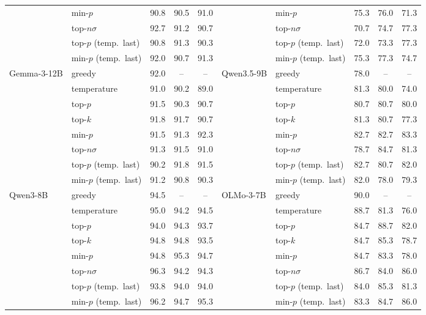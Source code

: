\begin{tabular}{llccc@{\hspace{14pt}}llccc}
 & min-$p$ & 90.8 & 90.5 & 91.0 &  & min-$p$ & 75.3 & 76.0 & 71.3 \\
 & top-$n\sigma$ & 92.7 & 91.2 & 90.7 &  & top-$n\sigma$ & 70.7 & 74.7 & 77.3 \\
 & top-$p$ (temp.\ last) & 90.8 & 91.3 & 90.3 &  & top-$p$ (temp.\ last) & 72.0 & 73.3 & 77.3 \\
 & min-$p$ (temp.\ last) & 92.0 & 90.7 & 91.3 &  & min-$p$ (temp.\ last) & 75.3 & 77.3 & 74.7 \\
\midrule
Gemma-3-12B & greedy & 92.0 & -- & -- & Qwen3.5-9B & greedy & 78.0 & -- & -- \\
 & temperature & 91.0 & 90.2 & 89.0 &  & temperature & 81.3 & 80.0 & 74.0 \\
 & top-$p$ & 91.5 & 90.3 & 90.7 &  & top-$p$ & 80.7 & 80.7 & 80.0 \\
 & top-$k$ & 91.8 & 91.7 & 90.7 &  & top-$k$ & 81.3 & 80.7 & 77.3 \\
 & min-$p$ & 91.5 & 91.3 & 92.3 &  & min-$p$ & 82.7 & 82.7 & 83.3 \\
 & top-$n\sigma$ & 91.3 & 91.5 & 91.0 &  & top-$n\sigma$ & 78.7 & 84.7 & 81.3 \\
 & top-$p$ (temp.\ last) & 90.2 & 91.8 & 91.5 &  & top-$p$ (temp.\ last) & 82.7 & 80.7 & 82.0 \\
 & min-$p$ (temp.\ last) & 91.2 & 90.8 & 90.3 &  & min-$p$ (temp.\ last) & 82.0 & 78.0 & 79.3 \\
\midrule
Qwen3-8B & greedy & 94.5 & -- & -- & OLMo-3-7B & greedy & 90.0 & -- & -- \\
 & temperature & 95.0 & 94.2 & 94.5 &  & temperature & 88.7 & 81.3 & 76.0 \\
 & top-$p$ & 94.0 & 94.3 & 93.7 &  & top-$p$ & 84.7 & 88.7 & 82.0 \\
 & top-$k$ & 94.8 & 94.8 & 93.5 &  & top-$k$ & 84.7 & 85.3 & 78.7 \\
 & min-$p$ & 94.8 & 95.3 & 94.7 &  & min-$p$ & 84.7 & 83.3 & 78.0 \\
 & top-$n\sigma$ & 96.3 & 94.2 & 94.3 &  & top-$n\sigma$ & 86.7 & 84.0 & 86.0 \\
 & top-$p$ (temp.\ last) & 93.8 & 94.0 & 94.0 &  & top-$p$ (temp.\ last) & 84.0 & 85.3 & 81.3 \\
 & min-$p$ (temp.\ last) & 96.2 & 94.7 & 95.3 &  & min-$p$ (temp.\ last) & 83.3 & 84.7 & 86.0 \\
\bottomrule
\end{tabular}
